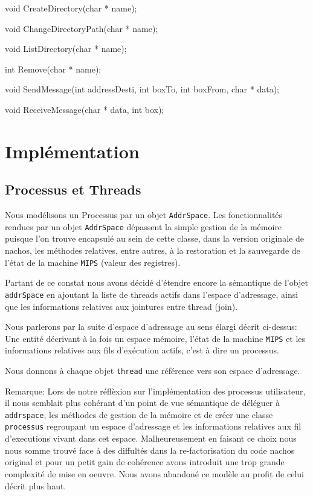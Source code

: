 \documentclass[11pt]{article}
\begin{document}
void CreateDirectory(char * name);

void ChangeDirectoryPath(char * name);

void ListDirectory(char * name);

int Remove(char * name);

void SendMessage(int addressDesti, int boxTo, int boxFrom, char * data);

void ReceiveMessage(char * data, int box);


\section{Implémentation}

\subsection{Processus et Threads}
Nous modélisons un Processus par un objet \texttt{AddrSpace}.
Les fonctionnalités rendues par un objet \texttt{AddrSpace} dépassent la simple gestion de la mémoire puisque l'on trouve encapsulé au sein de cette classe, dans la version originale de nachos, les méthodes relatives, entre autres, à la restoration et la sauvegarde de l'état de la machine \texttt{MIPS} (valeur des registres).

Partant de ce constat nous avons décidé d'étendre encore la sémantique de l'objet \texttt{addrSpace} en ajoutant la liste de threads actifs dans l'espace d'adressage, ainsi que les informations relatives aux jointures entre thread (join).

Nous parlerons par la suite d'espace d'adressage au sens élargi décrit ci-dessus:
Une entité décrivant à la fois un espace mémoire, l'état de la machine \texttt{MIPS} et les informations relatives aux fils d'exécution actifs, c'est à dire un processus.

Nous donnons à chaque objet \texttt{thread} une référence vers son espace d'adressage.

Remarque: Lors de notre réflèxion sur l'implémentation des processus utilisateur, il nous semblait plus cohérant d'un point de vue sémantique de déléguer à \texttt{addrspace}, les méthodes de gestion de la mémoire
et de créer une classe \texttt{processus} regroupant un espace d'adressage et les informations relatives aux fil d'executions vivant dans cet espace. Malheureusement en faisant ce choix nous nous somme trouvé face à des diffultés dans la re-factorisation du code nachos original et pour un petit gain de cohérence avons introduit une trop grande complexité de mise en oeuvre. Nous avons abandoné ce modèle au profit de celui décrit plus haut.
\end{document}
